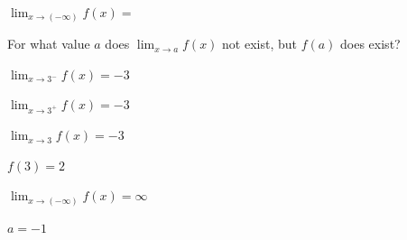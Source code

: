 \documentclass[11pt]{exam}
\begin{document}
\begin{questions}
\question[2]\,\label{graph-limit-start}

\question[1]
  $\displaystyle{\lim_{x \to (-\infty)} f(x)}=$\,\fillin[][1in] \\ \vspace*{.15in}

\question[1]
  For what value \(a\) does \(\displaystyle\lim_{x \to a} f(x)\) not exist, but \(f(a)\) does exist?\label{graph-limit-end} \vspace*{.15in}\answerline

\begin{solution}
\(\displaystyle \lim_{x \to 3^-} f(x) = \boxed{ -3 }\)

\(\displaystyle \lim_{x \to 3^+} f(x) = \boxed{ -3 }\)

\(\displaystyle \lim_{x \to 3} f(x) = \boxed{ -3 }\)

\(f(3) = \boxed{ 2 }\)

\(\displaystyle \lim_{x \to (-\infty)} f(x) = \boxed{ \infty }\)

\(\boxed{ a = -1 }\)
\end{solution}

\end{questions}




\UCblankpage

\blankpage
\end{document}
